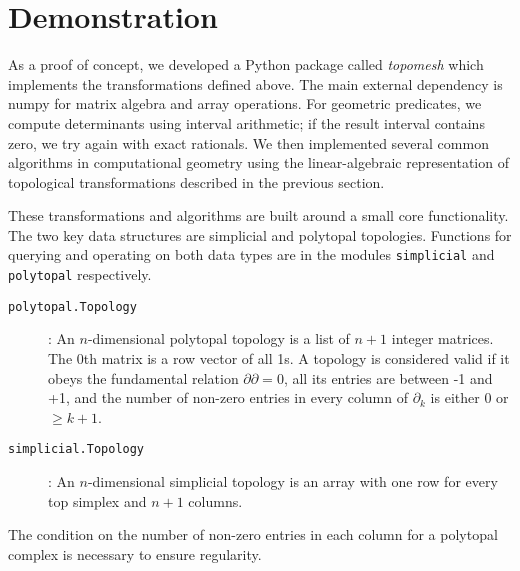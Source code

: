 \documentclass[twocolumn]{article}
\begin{document}
\section{Demonstration}

As a proof of concept, we developed a Python package called \emph{topomesh} which implements the transformations defined above.
The main external dependency is numpy for matrix algebra and array operations.
For geometric predicates, we compute determinants using interval arithmetic; if the result interval contains zero, we try again with exact rationals.
We then implemented several common algorithms in computational geometry using the linear-algebraic representation of topological transformations described in the previous section.

These transformations and algorithms are built around a small core functionality.
The two key data structures are simplicial and polytopal topologies.
Functions for querying and operating on both data types are in the modules \texttt{simplicial} and \texttt{polytopal} respectively.
\begin{description}
    \item[\texttt{polytopal.Topology}]: An $n$-dimensional polytopal topology is a list of $n + 1$ integer matrices.
        The 0th matrix is a row vector of all 1s.
        A topology is considered valid if it obeys the fundamental relation $\partial\partial = 0$, all its entries are between -1 and +1, and the number of non-zero entries in every column of $\partial_k$ is either 0 or $\ge k + 1$.
    \item[\texttt{simplicial.Topology}]: An $n$-dimensional simplicial topology is an array with one row for every top simplex and $n + 1$ columns.
\end{description}
The condition on the number of non-zero entries in each column for a polytopal complex is necessary to ensure regularity.
\end{document}
